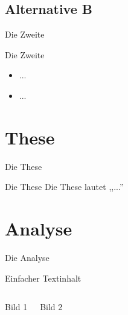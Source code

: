 \documentclass[mathserif,9pt]{beamer}
\begin{document}
		\subsection{Alternative B}
			\begin{frame}{Die Zweite}
				\begin{block}{Die Zweite}
					\begin{itemize}
						\item ...
						\item ...
					\end{itemize}
				\end{block}
			\end{frame}

	\section{These}
		\begin{frame}{Die These}
			\begin{block}{Die These}
				Die These lautet ,,...''
			\end{block}
		\end{frame}
			
	\section{Analyse}
		\begin{frame}{Die Analyse}
			\begin{eblock}
				Einfacher Textinhalt
			\end{eblock}
			
			\begin{eblock}
				\vspace{-4pt} %
				\begin{columns}
						\begin{wblock}
							Bild 1
						\end{wblock}
						\begin{wblock}
							Bild 2
						\end{wblock}
				\end{columns}
			\end{eblock}
		\end{frame}
		
\end{document}
